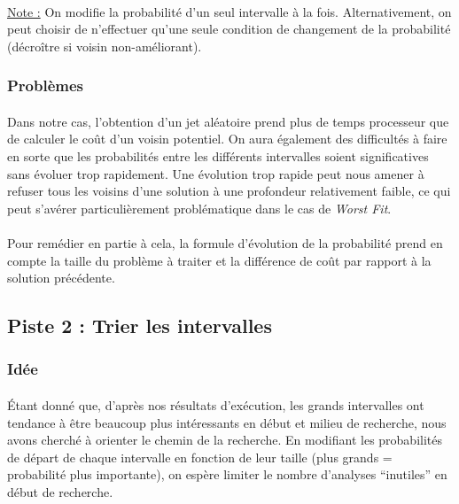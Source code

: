 \documentclass[a4paper,10pt]{report}
\begin{document}
\paragraph{}
\underline{Note :} On modifie la probabilité d'un seul intervalle à la fois.
Alternativement, on peut choisir de n'effectuer qu'une seule condition de
changement de la probabilité (décroître si voisin non-améliorant).



\subsubsection{Problèmes}

\paragraph{}
  Dans notre cas, l'obtention d'un jet aléatoire prend plus de temps processeur
que de calculer le coût d'un voisin potentiel. On aura également des difficultés
à faire en sorte que les probabilités entre les différents intervalles soient
significatives sans évoluer trop rapidement. Une évolution trop rapide peut nous
amener à refuser tous les voisins d'une solution à une profondeur relativement
faible, ce qui peut s'avérer particulièrement problématique dans le cas de
\textit{Worst Fit}.
\paragraph{}
  Pour remédier en partie à cela, la formule d'évolution de la probabilité prend
en compte la taille du problème à traiter et la différence de coût par rapport à
la solution précédente.

\pagebreak
\subsection{Piste 2 : Trier les intervalles}
\subsubsection{Idée}

\paragraph{}
  Étant donné que, d'après nos résultats d'exécution, les grands intervalles ont
tendance à être beaucoup plus intéressants en début et milieu de recherche, nous
avons cherché à orienter le chemin de la recherche. En modifiant les
probabilités de départ de chaque intervalle en fonction de leur taille (plus
grands = probabilité plus importante), on espère limiter le nombre d'analyses
``inutiles'' en début de recherche.
\end{document}

